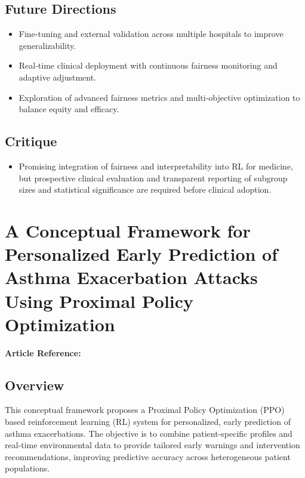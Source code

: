 \subsection*{Future Directions}
\begin{itemize}
    \item Fine-tuning and external validation across multiple hospitals to improve generalizability.
    \item Real-time clinical deployment with continuous fairness monitoring and adaptive adjustment.
    \item Exploration of advanced fairness metrics and multi-objective optimization to balance equity and efficacy.
\end{itemize}

\subsection*{Critique}
\begin{itemize}
    \item Promising integration of fairness and interpretability into RL for medicine, but prospective clinical evaluation and transparent reporting of subgroup sizes and statistical significance are required before clinical adoption.
\end{itemize}

\section{A Conceptual Framework for Personalized Early Prediction of Asthma Exacerbation Attacks Using Proximal Policy Optimization}
\textbf{Article Reference:} \cite{ConceptualFrameworkPersonalized}

\subsection*{Overview}
This conceptual framework proposes a Proximal Policy Optimization (PPO) based reinforcement learning (RL) system for personalized, early prediction of asthma exacerbations. The objective is to combine patient-specific profiles and real-time environmental data to provide tailored early warnings and intervention recommendations, improving predictive accuracy across heterogeneous patient populations.

